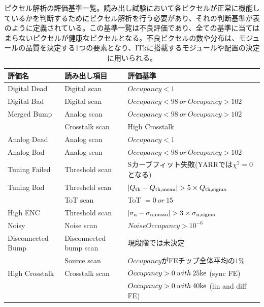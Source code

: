 \begin{table}[tbp]
\begin{center}
\caption[ピクセル解析の評価基準一覧]{ピクセル解析の評価基準一覧\cite{3-1}。読み出し試験において各ピクセルが正常に機能しているかを判断するためにピクセル解析を行う必要があり、それの判断基準が表のように定義されている。この基準一覧は不良評価であり、全ての基準に当てはまらないピクセルが健康なピクセルとなる。不良ピクセルの数や分布は、モジュールの品質を決定する1つの要素となり、ITkに搭載するモジュールや配置の決定に用いられる。}
\label{pixel_analysis_criteria}
  \scriptsize
  \begin{tabular}{|lll|} \hline
    評価名 & 読み出し項目 & 評価基準 \\ \hline
    Digital Dead      & Digital scan           & $Occupancy < 1$ \\ \hline
    Digital Bad       & Digital scan           & $Occupancy < 98 \: or \: Occupancy > 102$ \\\hline 
    Merged Bump       & Analog scan            & $Occupancy < 98 \: or \: Occupancy > 102$  \\ 
                      & Crosstalk scan         & High Crosstalk\\ \hline
    Analog Dead       & Analog scan            & $Occupancy < 1$ \\ \hline
    Analog Bad        & Analog scan            & $Occupancy < 98 \: or \: Occupancy > 102$ \\ \hline
    Tuning Failed     & Threshold scan         & Sカーブフィット失敗(YARRでは$\chi^2=0$となる) \\ \hline
    Tuning Bad        & Thresheld scan         & $|Q_{\rm th}-Q_{\rm th,mean}| > 5 \times Q_{\rm th,sigma}$ \\ 
                      & ToT scan               & ToT $ = 0 \: or \: 15 $\\ \hline
    High ENC          & Threshold scan         & $|\sigma_{\rm n}-\sigma_{\rm n,mean}| > 3 \times \sigma_{\rm n,sigma}$\\ \hline
    Noisy             & Noise scan             & $NoiseOccupancy > 10^{-6}$\\ \hline
    Disconnected Bump & Disconnected bump scan & 現段階では未決定 \\ 
                      & Source scan            & $Occupancy$がFEチップ全体平均の$1\%$ \\ \hline
    High Crosstalk    & Crosstalk scan         & $Occupancy>0 \: with \: 25{\rm ke}$ (sync FE)\\
                      &                        & $Occupancy>0 \: with \: 40{\rm ke}$ (lin and diff FE)\\ \hline 
  \end{tabular}
\end{center}
\end{table}


